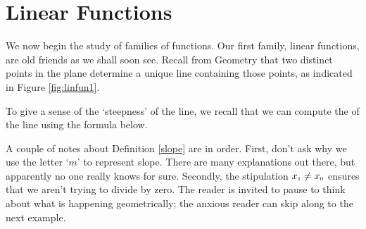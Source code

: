 \section{Linear Functions}

\label{LinearFunctions}

We now begin the study of families of functions.  Our first family, linear functions, are old friends as we shall soon see.  Recall from Geometry that two distinct points in the plane determine a unique line containing those points, as indicated in Figure \ref{fig:linfun1}.


To give a sense of the `steepness' of the line, we recall that we can compute the  of the line using the formula below.

\smallskip





\smallskip

A couple of notes about Definition \ref{slope} are in order.  First, don't ask why we use the letter `$m$' to represent slope.  There are many explanations out there, but apparently no one really knows for sure. Secondly, the stipulation  $x_{\mbox{\tiny$1$}} \neq x_{\mbox{\tiny$0$}}$ ensures that we aren't trying to divide by zero.  The reader is invited to pause to think about what is happening geometrically; the anxious reader can skip along to the next example.


\medskip

